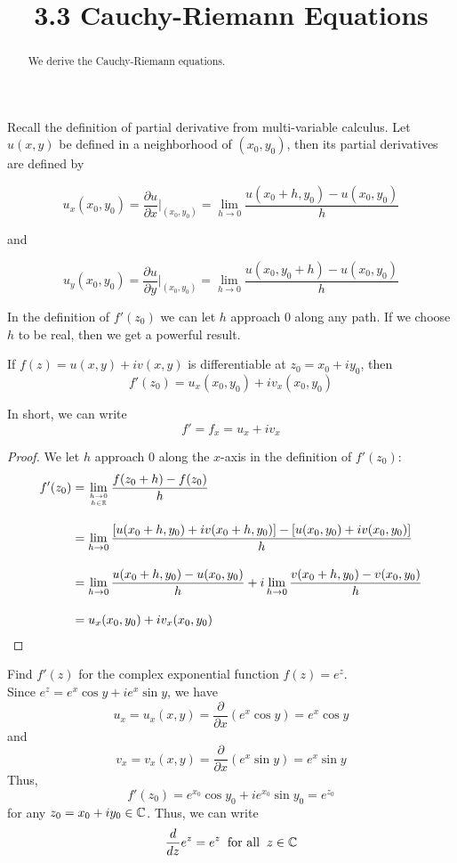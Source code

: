 \documentclass[handout]{ximera}
\title{3.3 Cauchy-Riemann Equations}
\begin{document}
\begin{abstract}
We derive the Cauchy-Riemann equations.
\end{abstract}

\maketitle

Recall the definition of partial derivative from multi-variable calculus.  
Let $u(x,y)$ be defined in a neighborhood of $(x_0,y_0)$, then its partial derivatives are defined by

\[
u_x(x_0, y_0) = \frac{\partial u}{\partial x}\Bigg|_{(x_0,y_0)} = \lim_{h \to 0} \frac{u(x_0 +h, y_0) - u(x_0,y_0)}{h}
\]

and

\[
u_y(x_0, y_0) = \frac{\partial u}{\partial y}\Bigg|_{(x_0,y_0)} = \lim_{h \to 0} \frac{u(x_0 , y_0+h) - u(x_0,y_0)}{h}
\]

In the definition of $f'(z_0)$ we can let $h$ approach $0$ along any path. If we choose $h$ to be real, then we get a powerful result.
\begin{theorem}
If $f(z) = u(x,y) + iv(x,y)$ is differentiable at $z_0 = x_0 + iy_0$, then
\[
f'(z_0) = u_x(x_0,y_0) + iv_x(x_0,y_0)
\]
\end{theorem}

\begin{remark}
In short, we can write
\[
f' = f_x = u_x + iv_x
\]
\end{remark}

\begin{proof}
We let $h$ approach $0$ along the $x$-axis in the definition of $f'(z_0)$:
\begin{align*}
f'(z_0) &= \lim_{h \to 0 \atop h \in \mathbb R} \frac{f(z_0 + h) -f(z_0)}{h} \\[10pt]
        &= \lim_{h \to 0} \frac{\left[u(x_0 +h, y_0) + iv(x_0 +h, y_0)\right] - \left[u(x_0,y_0)+iv(x_0, y_0)\right]}{h} \\[10pt]
        &=  \lim_{h \to 0} \frac{u(x_0 +h, y_0)- u(x_0,y_0)}{h} +i\lim_{h \to 0}\frac{v(x_0 +h, y_0)-v(x_0, y_0)}{h} \\[10pt]
        &= u_x(x_0,y_0) + iv_x(x_0,y_0)
\end{align*}
\end{proof}




\begin{example}
Find $f'(z)$ for the complex exponential function $f(z) = e^z$.\\
Since $e^z = e^x \cos y + i e^x \sin y$, we have
\[
u_x = u_x(x,y) = \frac{\partial}{\partial x} \left(e^x \cos y \right)= e^x \cos y 
\]
and
\[
 v_x = v_x(x,y) = \frac{\partial}{\partial x}\left(e^x \sin y\right) = e^x \sin y
\]
Thus, 
\[
f'(z_0) = e^{x_0} \cos y_0 + i e^{x_0} \sin y_0  = e^{z_0}
\]
for any $z_0 = x_0 + iy_0 \in \mathbb C$.
Thus, we can write
\[
\frac{d}{dz} e^z = e^z \;\; \mbox{for all} \;\; z \in \mathbb C
\]
\end{example}
\end{document}
